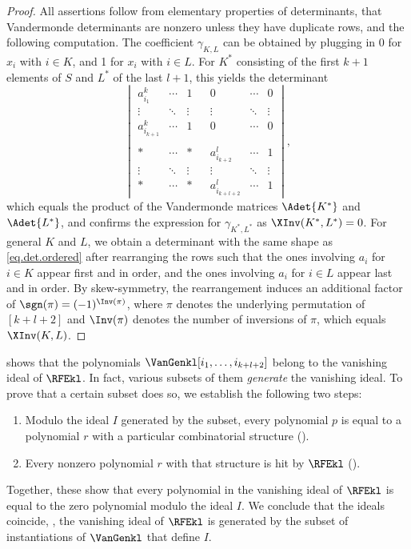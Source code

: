 \documentclass{toc}
\begin{document}
\begin{proof}
  All assertions follow from
  elementary properties of determinants, that Vandermonde
  determinants are nonzero unless they have duplicate rows,
  and the following computation. The coefficient $\gamma_{K,L}$ can be obtained by plugging in 0 for $x_i$ with $i \in K$, and 1 for $x_i$ with $i \in L$. For $K^*$ consisting of the first $k+1$ elements of $S$ and $L^*$ of the last $l+1$, this yields the determinant
  \begin{equation}\label{eq.det.ordered}
    \begin{vmatrix*}
      a_{i_1}^k     & \cdots & 1      && 0      & \cdots & 0 \\
      \vdots        & \ddots & \vdots && \vdots & \ddots & \vdots \\
      a_{i_{k+1}}^k & \cdots & 1      && 0      & \cdots & 0 \\
      \\
      *      & \cdots & *      && a_{i_{k+2}}^l   & \cdots & 1 \\
      \vdots & \ddots & \vdots && \vdots          & \ddots & \vdots \\
      *      & \cdots & *      && a_{i_{k+l+2}}^l & \cdots & 1
    \end{vmatrix*},
  \end{equation}
  which equals the product of the Vandermonde matrices $\Adet{K^*}$ and $\Adet{L^*}$, and confirms the expression for $\gamma_{K^*,L^*}$ as $\XInv(K^*,L^*)=0$. For general $K$ and $L$, we obtain a determinant with the same shape as \eqref{eq.det.ordered} after rearranging the rows such that the ones involving $a_i$ for $i \in K$ appear first and in order, and the ones involving $a_i$ for $i \in L$ appear last and in order. By skew-symmetry, the rearrangement induces an additional factor of $\sgn(\pi) = (-1)^{\Inv(\pi)}$, where $\pi$ denotes the underlying permutation of $[k+l+2]$ and $\Inv(\pi)$ denotes the number of inversions of $\pi$, which equals $\XInv(K,L)$. 
\end{proof}

 shows that the polynomials $\VanGenkl[i_1,\dots,i_{k+l+2}]$ belong to the vanishing ideal of $\RFEkl$. In fact, various subsets of them \emph{generate} the vanishing ideal. To prove that a certain subset does so, we establish the following two steps:
\begin{enumerate}
  \item
    Modulo the ideal $I$ generated by the subset, 
    every polynomial $p$ is equal
    to a polynomial $r$ with a particular combinatorial structure
    ().
  \item
    Every nonzero polynomial $r$ with that structure is hit by
    $\RFEkl$ ().
\end{enumerate}
Together,
these show that every polynomial in the vanishing ideal of $\RFEkl$ is equal to the zero polynomial modulo the ideal $I$. 
We conclude that the ideals coincide,
\ie, the vanishing ideal of $\RFEkl$ is generated by the subset of instantiations of \(\VanGenkl\) that define $I$.
\end{document}
